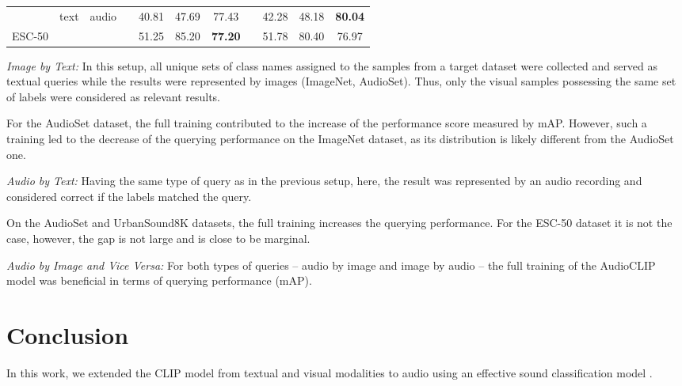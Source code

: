 \documentclass[runningheads]{llncs}
\begin{document}
\begin{table}[tbp]
\begin{threeparttable}[t]
\begin{tabularx}{\linewidth}{Xcccccccccc}
\addlinespace[0.5em]

\multicolumn{1}{l}{UrbanSound8K} & \multicolumn{1}{c}{\multirow{2}{*}{text}} & \multicolumn{1}{c}{\multirow{2}{*}{audio}} & & \multicolumn{1}{c}{40.81} & \multicolumn{1}{c}{47.69} & \multicolumn{1}{c}{77.43} &  & \multicolumn{1}{c}{42.28} & \multicolumn{1}{c}{48.18} & \multicolumn{1}{c}{\textbf{80.04}} \\

\multicolumn{1}{l}{ESC-50} & & & & \multicolumn{1}{c}{51.25} & \multicolumn{1}{c}{85.20} & \multicolumn{1}{c}{\textbf{77.20}} &  & \multicolumn{1}{c}{51.78} & \multicolumn{1}{c}{80.40} & \multicolumn{1}{c}{76.97} \\

\bottomrule

\end{tabularx}
\end{threeparttable}
\end{table}

\emph{Image by Text:} In this setup, all unique sets of class names assigned to the samples from a target dataset were collected and served as textual queries while the results were represented by images (\mbox{ImageNet}, \mbox{AudioSet}).
Thus, only the visual samples possessing the same set of labels were considered as relevant results.

For the \mbox{AudioSet} dataset, the full training contributed to the increase of the performance score measured by mAP.
However, such a training led to the decrease of the querying performance on the \mbox{ImageNet} dataset, as its distribution is likely different from the \mbox{AudioSet} one.

\emph{Audio by Text:} Having the same type of query as in the previous setup, here, the result was represented by an audio recording and considered correct if the labels matched the query.

On the \mbox{AudioSet} and \mbox{UrbanSound8K} datasets, the full training increases the querying performance.
For the \mbox{ESC-50} dataset it is not the case, however, the gap is not large and is close to be marginal.

\emph{Audio by Image and Vice Versa:} For both types of queries -- audio by image and image by audio -- the full training of the \mbox{AudioCLIP} model was beneficial in terms of querying performance (mAP).

\section{Conclusion} \label{sec:conclusion}
In this work, we extended the \mbox{CLIP} model \cite{radford2021clip} from textual and visual modalities to audio using an effective sound classification model \cite{guzhov2021esrnx}.
\end{document}
